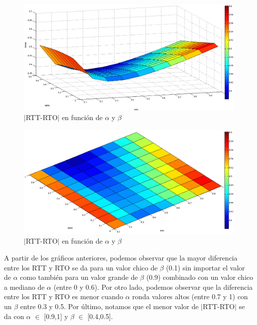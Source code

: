 \documentclass[10pt, a4paper]{article}
\begin{document}
\begin{figure}[H]
\begin{center}
\includegraphics[width=17cm]{alphaBetaCorteCostado.png}
\caption{$|$RTT-RTO$|$ en función de $\alpha$ y $\beta$}
\end{center}
\end{figure}

\begin{figure}[H]
\begin{center}
\includegraphics[width=17cm]{alpha-beta-dif-sinCeroB.png}
\caption{$|$RTT-RTO$|$ en función de $\alpha$ y $\beta$}
\end{center}
\end{figure}

A partir de los gráficos anteriores, podemos observar que la mayor diferencia entre los RTT y RTO se da para un valor chico de $\beta$ (0.1) sin importar el valor de $\alpha$ como también para un valor grande de $\beta$ (0.9) combinado con un valor chico a mediano de $\alpha$ (entre 0 y 0.6).
Por otro lado, podemos observar que la diferencia entre los RTT y RTO es menor cuando $\alpha$ ronda valores altos (entre 0.7 y 1) con un $\beta$ entre 0.3 y 0.5.
Por último, notamos que el menor valor de $|$RTT-RTO$|$ se da con $\alpha$ $\in$ [0.9,1] y $\beta$ $\in$ [0.4,0.5].
\end{document}
